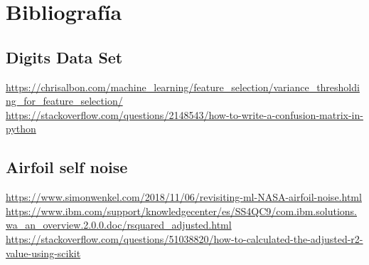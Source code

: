 \documentclass[titlepage]{article}
\begin{document}
\section{Bibliografía}
\subsection{Digits Data Set}


\url{https://chrisalbon.com/machine_learning/feature_selection/variance_thresholding_for_feature_selection/}
\\
\url{https://stackoverflow.com/questions/2148543/how-to-write-a-confusion-matrix-in-python}
\\

\subsection{Airfoil self noise}
\url{https://www.simonwenkel.com/2018/11/06/revisiting-ml-NASA-airfoil-noise.html}
\\
\url{https://www.ibm.com/support/knowledgecenter/es/SS4QC9/com.ibm.solutions.wa_an_overview.2.0.0.doc/rsquared_adjusted.html}
\\
\url{https://stackoverflow.com/questions/51038820/how-to-calculated-the-adjusted-r2-value-using-scikit}
\end{document}
